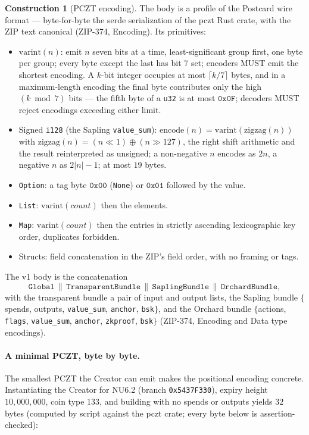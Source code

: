 \documentclass[11pt,a4paper]{article}
\theoremstyle{definition}
\newtheorem{construction}[theorem]{Construction}
\begin{document}
\begin{construction}[PCZT encoding]
The body is a profile of the Postcard wire format --- byte-for-byte the
serde serialization of the \textsf{pczt} Rust crate, with the ZIP text
canonical (ZIP-374, Encoding). Its primitives:
\begin{itemize}
\item $\mathrm{varint}(n)$: emit $n$ seven bits at a time,
  least-significant group first, one byte per group; every byte except
  the last has bit $7$ set; encoders MUST emit the shortest encoding. A
  $k$-bit integer occupies at most $\lceil k/7 \rceil$ bytes, and in a
  maximum-length encoding the final byte contributes only the high
  $(k \bmod 7)$ bits --- the fifth byte of a \texttt{u32} is at most
  $\mathtt{0x0F}$; decoders MUST reject encodings exceeding either limit.
\item Signed \texttt{i128} (the Sapling \texttt{value\_sum}):
  $\mathrm{encode}(n) = \mathrm{varint}(\mathrm{zigzag}(n))$ with
  $\mathrm{zigzag}(n) = (n \ll 1) \oplus (n \gg 127)$, the right shift
  arithmetic and the result reinterpreted as unsigned; a non-negative $n$
  encodes as $2n$, a negative $n$ as $2|n| - 1$; at most $19$ bytes.
\item \texttt{Option}: a tag byte $\mathtt{0x00}$ (\texttt{None}) or
  $\mathtt{0x01}$ followed by the value.
\item \texttt{List}: $\mathrm{varint}(\mathit{count})$ then the elements.
\item \texttt{Map}: $\mathrm{varint}(\mathit{count})$ then the entries in
  strictly ascending lexicographic key order, duplicates forbidden.
\item Structs: field concatenation in the ZIP's field order, with no
  framing or tags.
\end{itemize}
The v1 body is the concatenation
\[
\texttt{Global} \,\|\, \texttt{TransparentBundle} \,\|\,
\texttt{SaplingBundle} \,\|\, \texttt{OrchardBundle},
\]
with the transparent bundle a pair of input and output lists, the
Sapling bundle $\{$spends, outputs, \texttt{value\_sum}, \texttt{anchor},
\texttt{bsk}$\}$, and the Orchard bundle $\{$actions, \texttt{flags},
\texttt{value\_sum}, \texttt{anchor}, \texttt{zkproof}, \texttt{bsk}$\}$
(ZIP-374, Encoding and Data type encodings).
\end{construction}

\paragraph{A minimal PCZT, byte by byte.} The smallest PCZT the Creator can
emit makes the positional encoding concrete. Instantiating the Creator for
NU6.2 (branch \texttt{0x5437F330}), expiry height $10{,}000{,}000$, coin type
$133$, and building with no spends or outputs yields $32$ bytes (computed by
script against the \textsf{pczt} crate; every byte below is
assertion-checked):
\end{document}
